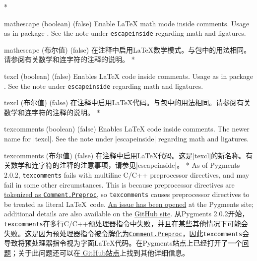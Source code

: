 \begin{optionlist}
\begin{paracol}{2}
\switchcolumn[0]*%
\item[mathescape (boolean) (false)]
Enable \LaTeX{} math mode inside comments.
Usage as in package .
See the note under \texttt{escapeinside} regarding math and ligatures.
\switchcolumn
\item[mathescape (布尔值) (false)]
在注释中启用\LaTeX{}数学模式。与包中的用法相同。请参阅有关数学和连字符的注释的说明。
\switchcolumn[0]*%
\item[texcl (boolean) (false)]
Enables \LaTeX{} code inside comments.
Usage as in package .  See the note under \texttt{escapeinside} regarding math and ligatures.
\switchcolumn
\item[texcl (布尔值) (false)]
在注释中启用\LaTeX{}代码。与包中的用法相同。请参阅有关数学和连字符的注释的说明。
\switchcolumn[0]*%
\item[texcomments (boolean) (false)]
Enables \LaTeX{} code inside comments.  The newer name for |texcl|.  See the note under |escapeinside| regarding math and ligatures.
\switchcolumn
\item[texcomments (布尔值) (false)]
在注释中启用\LaTeX{}代码。这是|texcl|的新名称。有关数学和连字符的注释的注意事项，请参见|escapeinside|。
\switchcolumn[0]*%
As of Pygments 2.0.2, \texttt{texcomments} fails with multiline C/C++ preprocessor directives, and may fail in some other circumstances.  This is because preprocessor directives are \href{http://pygments.org/docs/tokens/}{tokenized as \texttt{Comment.Preproc}}, so \texttt{texcomments} causes preprocessor directives to be treated as literal \LaTeX\ code.  \href{https://bitbucket.org/birkenfeld/pygments-main/issue/1086/wrong-processing-of-in-c-c-macros-if-is}{An issue has been opened} at the Pygments site; additional details are also available on the \href{https://github.com/gpoore/minted/issues/66}{ GitHub site}.
\switchcolumn
从Pygments 2.0.2开始，\texttt{texcomments}在多行C/C++预处理器指令中失败，并且在某些其他情况下可能会失败。这是因为预处理器指令被\href{http://pygments.org/docs/tokens/}{令牌化为\texttt{Comment.Preproc}}，因此\texttt{texcomments}会导致将预处理器指令视为字面\LaTeX{}代码。在Pygments站点上已经打开了一个\href{https://bitbucket.org/birkenfeld/pygments-main/issue/1086/wrong-processing-of-in-c-c-macros-if-is}{问题}；关于此问题还可以在\href{https://github.com/gpoore/minted/issues/66}{ GitHub站点}上找到其他详细信息。
\end{paracol}
\end{optionlist}

